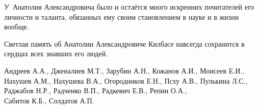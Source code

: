 У~Анатолия Александровича было и остаётся много искренних почитателей его личности и таланта, обязанных ему своим становлением в науке и в жизни вообще.



Светлая память об Анатолии Александровиче Килбасе навсегда сохранится в сердцах всех знавших его людей.













\begin{flushright} \it \footnotesize

Андреев А.А., Дженалиев М.Т., Зарубин А.Н., Кожанов А.И., Моисеев Е.И., \\

Нахушев А.М., Нахушева В.А., Огородников Е.Н., Псху А.В., Пулькина Л.С., \\

Раджабов Н.Р., Радченко В.П., Радкевич Е.В., Репин О.А., \\

 Сабитов К.Б., Солдатов А.П. 



 \end{flushright}



%

%

%

